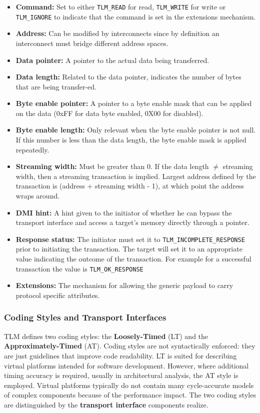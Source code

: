 \documentclass[11pt]{article}
\begin{document}
\begin{itemize}
\item \textbf{Command:} Set to either \texttt{TLM\_READ} for read, \texttt{TLM\_WRITE} for write or \texttt{TLM\_IGNORE} to indicate that the command is set in the extensions mechanism.
\item \textbf{Address:} Can be modified by interconnects since by definition an interconnect must bridge different address spaces.
\item \textbf{Data pointer:} A pointer to the actual data being transferred.
\item \textbf{Data length:} Related to the data pointer, indicates the number of bytes that are being transfer-ed.
\item \textbf{Byte enable pointer:} A pointer to a byte enable mask that can be applied on the data (0xFF for data byte enabled, 0X00 for disabled).
\item \textbf{Byte enable length:} Only relevant when the byte enable pointer is not null. If this number is less than the data length, the byte enable mask is applied repeatedly.
\item \textbf{Streaming width:} Must be greater than 0. If the data length \(\neq\) streaming width, then a streaming transaction is implied. Largest address defined by the transaction is (address + streaming width - 1), at which point the address wraps around.
\item \textbf{DMI hint:} A hint given to the initiator of whether he can bypass the transport interface and access a target's memory directly through a pointer.
\item \textbf{Response status:} The initiator must set it to \texttt{TLM\_INCOMPLETE\_RESPONSE} prior to initiating the transaction. The target will set it to an appropriate value indicating the outcome of the transaction. For example for a successful transaction the value is \texttt{TLM\_OK\_RESPONSE}
\item \textbf{Extensions:} The mechanism for allowing the generic payload to carry protocol specific attributes.
\end{itemize}

\subsubsection{Coding Styles and Transport Interfaces}
\label{sec:orgcd563aa}
TLM defines two coding styles: the \textbf{Loosely-Timed} (LT) and the \textbf{Approximately-Timed} (AT).
Coding styles are not syntactically enforced: they are just guidelines that improve code readability.
LT is suited for describing virtual platforms intended for software development.
However, where additional timing accuracy is required, usually in architectural analysis, the AT style is employed.
Virtual platforms typically do not contain many cycle-accurate models of complex components because of the performance impact. 
The two coding styles are distinguished by the \textbf{transport interface} components realize.
\end{document}
